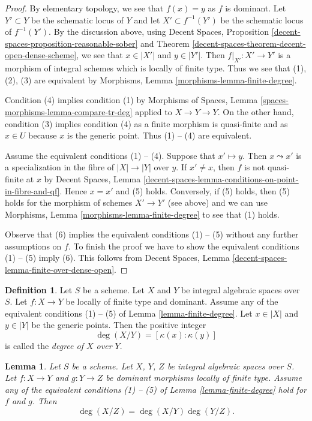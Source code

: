 \documentclass{stacks-project}
\theoremstyle{plain}
\newtheorem{lemma}[subsection]{Lemma}
\theoremstyle{definition}
\newtheorem{definition}[subsection]{Definition}
\theoremstyle{remark}
\numberwithin{equation}{subsection}
\begin{document}
\begin{proof}
By elementary topology, we see that $f(x) = y$ as $f$ is dominant.
Let $Y' \subset Y$ be the schematic locus of $Y$ and let
$X' \subset f^{-1}(Y')$ be the schematic locus of $f^{-1}(Y')$.
By the discussion above, using
Decent Spaces, Proposition \ref{decent-spaces-proposition-reasonable-sober} and
Theorem \ref{decent-spaces-theorem-decent-open-dense-scheme},
we see that $x \in |X'|$ and $y \in |Y'|$.
Then $f|_{X'} : X' \to Y'$ is a morphism of integral schemes
which is locally of finite type. Thus we see that (1), (2), (3)
are equivalent by Morphisms, Lemma \ref{morphisms-lemma-finite-degree}.

\medskip\noindent
Condition (4) implies condition (1) by
Morphisms of Spaces, Lemma \ref{spaces-morphisms-lemma-compare-tr-deg}
applied to $X \to Y \to Y$.
On the other hand, condition (3) implies condition (4) as
a finite morphism is quasi-finite and as $x \in U$ because $x$
is the generic point. Thus (1) -- (4) are equivalent.

\medskip\noindent
Assume the equivalent conditions (1) -- (4). Suppose that
$x' \mapsto y$. Then $x \leadsto x'$ is a specialization in the
fibre of $|X| \to |Y|$ over $y$. If $x' \not = x$, then $f$ is not
quasi-finite at $x$ by Decent Spaces, Lemma
\ref{decent-spaces-lemma-conditions-on-point-in-fibre-and-qf}.
Hence $x = x'$ and (5) holds. Conversely, if (5) holds, then
(5) holds for the morphism of schemes $X' \to Y'$ (see above)
and we can use
Morphisms, Lemma \ref{morphisms-lemma-finite-degree}
to see that (1) holds.

\medskip\noindent
Observe that (6) implies the equivalent conditions (1) -- (5)
without any further assumptions on $f$. To finish the proof
we have to show the equivalent conditions (1) -- (5) imply (6).
This follows from Decent Spaces, Lemma
\ref{decent-spaces-lemma-finite-over-dense-open}.
\end{proof}

\begin{definition}
\label{definition-degree}
Let $S$ be a scheme.
Let $X$ and $Y$ be integral algebraic spaces over $S$.
Let $f : X \to Y$ be locally of finite type and dominant.
Assume any of the equivalent conditions (1) -- (5) of
Lemma \ref{lemma-finite-degree}. Let $x \in |X|$ and $y \in |Y|$
be the generic points. Then the positive integer
$$
\deg(X/Y) = [\kappa(x) : \kappa(y)]
$$
is called the {\it degree of $X$ over $Y$}.
\end{definition}

\begin{lemma}
\label{lemma-degree-composition}
Let $S$ be a scheme.
Let $X$, $Y$, $Z$ be integral algebraic spaces over $S$.
Let $f : X \to Y$ and $g : Y \to Z$ be dominant morphisms locally
of finite type. Assume any of the equivalent conditions
(1) -- (5) of Lemma \ref{lemma-finite-degree} hold for $f$ and $g$. Then
$$
\deg(X/Z) = \deg(X/Y) \deg(Y/Z).
$$
\end{lemma}
\end{document}

